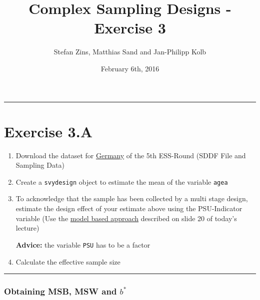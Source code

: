 \documentclass[]{article}
\title{Complex Sampling Designs - Exercise 3}
\author{Stefan Zins, Matthias Sand and Jan-Philipp Kolb}
\date{February 6th, 2016}
\begin{document}
\maketitle

\begin{center}\rule{0.5\linewidth}{\linethickness}\end{center}

\section{Exercise 3.A}\label{exercise-3.a}

\begin{enumerate}
\def\labelenumi{\arabic{enumi}.}
\item
  Download the dataset for
  \href{http://www.europeansocialsurvey.org/data/country.html?c=germany}{Germany}
  of the 5th ESS-Round (SDDF File and Sampling Data)
\item
  Create a \texttt{svydesign} object to estimate the mean of the
  variable \texttt{agea}
\item
  To acknowledge that the sample has been collected by a multi stage
  design, estimate the design effect of your estimate above using the
  PSU-Indicator variable (Use the
  \href{https://github.com/BernStZi/SamplingAndEstimation/blob/short/lecture/part_2.pdf}{model
  based approach} described on slide 20 of today's lecture)

  \textbf{Advice:} the variable \texttt{PSU} has to be a factor\\
\item
  Calculate the effective sample size
\end{enumerate}

\begin{center}\rule{0.5\linewidth}{\linethickness}\end{center}

\subsubsection{\texorpdfstring{Obtaining MSB, MSW and
\(b^{*}\)}{Obtaining MSB, MSW and b\^{}\{*\}}}\label{obtaining-msb-msw-and-b}
\end{document}
